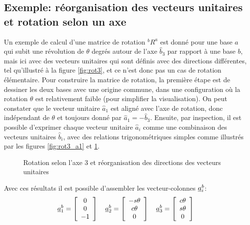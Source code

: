 \subsection{Exemple: réorganisation des vecteurs unitaires et rotation selon un axe}
%
Un exemple de calcul d'une matrice de rotation $^bR^a$ est donné pour une base $a$ qui subit une révolution de $\theta$ degrés autour de l'axe $\hat{b}_3$ par rapport à une base $b$, mais ici avec des vecteurs unitaires qui sont définis avec des directions différentes, tel qu'illustré à la figure \ref{fig:rot3}, et ce n'est donc pas un cas de rotation élémentaire. Pour construire la matrice de rotation, la première étape est de dessiner les deux bases avec une origine commune, dans une configuration où la rotation $\theta$ est relativement faible (pour simplifier la visualisation). On peut constater que le vecteur unitaire $\hat{a}_1$ est aligné avec l'axe de rotation, donc indépendant de $\theta$ et toujours donné par $\hat{a}_1=-\hat{b}_3$. Ensuite, par inspection, il est possible d'exprimer chaque vecteur unitaire $\hat{a}_i$ comme une combinaison des vecteurs unitaires $\hat{b}_i$, avec des relations trigonométriques simples comme illustrés par les figures \ref{fig:rot3_a1} et \ref{fig:rot3_a2}. 
%
\begin{figure}[H]
        \centering
				\hspace{20pt}
				\hspace{20pt}
        \caption{Rotation selon l'axe 3 et réorganisation des directions des vecteurs unitaires}
				\label{fig:rot3_a2}
\end{figure}
%
Avec ces résultats il est possible d'assembler les vecteur-colonnes $\underline{a}_i^b$:
\begin{align}
\underline{a}_1^b = \left[ \begin{array}{c} 0 \\ 0 \\ -1  \end{array} \right] \quad
\underline{a}_2^b = \left[ \begin{array}{c} -s\theta \\ c\theta \\ 0 \end{array} \right] \quad
\underline{a}_3^b = \left[ \begin{array}{c} c\theta \\ s\theta \\ 0   \end{array} \right]
\end{align}
